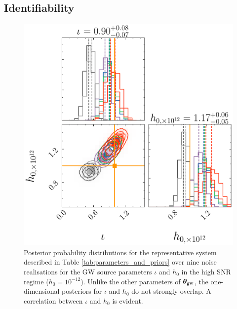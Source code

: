 \documentclass[fleqn,usenatbib,useAMS]{mnras}
\begin{document}
\subsection{Identifiability}\label{sec:identif}
\begin{figure}
	\centering
	\includegraphics[width=\columnwidth]{images/stacked_GW_plot_iota_h}
	\caption{Posterior probability distributions for the representative system described in Table \ref{tab:parameters_and_priors} over nine noise realisations for the GW source parameters $\iota$ and $h_0$ in the high SNR regime ($h_0 = 10^{-12}$). Unlike the other parameters of  $\boldsymbol{\theta}_{\rm gw}$, the one-dimensional posteriors for $\iota$ and $h_0$ do not strongly overlap. A correlation between  $\iota$ and $h_0$ is evident.}
	\label{fig:just_iota_h}
\end{figure}
\end{document}
